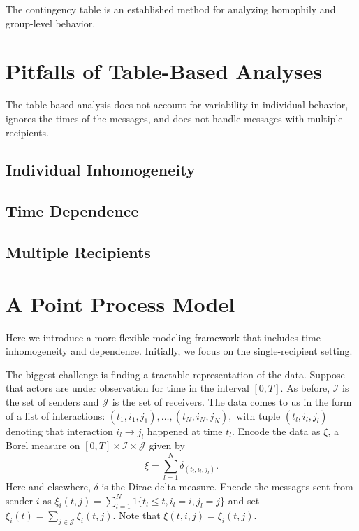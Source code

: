 \documentclass[aoas,preprint]{imsart}
\begin{document}
The contingency table is an established method for analyzing homophily and
group-level behavior.

\section{Pitfalls of Table-Based Analyses}

The table-based analysis does not account for variability in individual
behavior, ignores the times of the messages, and does not handle messages with
multiple recipients.

\subsection{Individual Inhomogeneity}
\subsection{Time Dependence}
\subsection{Multiple Recipients}


\section{A Point Process Model}

Here we introduce a more flexible modeling framework that includes
time-inhomogeneity and dependence.  Initially, we focus on the
single-recipient setting.

The biggest challenge is finding a tractable representation of the data.
Suppose that actors are under observation for time in the interval $[0,T]$. As
before, $\mathcal{I}$ is the set of senders and $\mathcal{J}$ is the set of
receivers. The data comes to us in the form of a list of interactions: $(t_1,
i_1, j_1), \ldots, (t_N, i_N, j_N),$ with tuple $(t_l, i_l, j_l)$ denoting
that interaction $i_l \to j_l$ happened at time $t_l$.  Encode the data as
$\xi$, a Borel measure on $[0,T] \times \mathcal{I} \times \mathcal{J}$ given
by
\[
    \xi = \sum_{l=1}^{N} \delta_{(t_l, i_l, j_l)}.
\]
Here and elsewhere, $\delta$ is the Dirac delta measure.  Encode the messages
sent from sender $i$ as 
$\xi_i(t, j) = \sum_{l=1}^N 1\{t_l \leq t, i_l = i, j_l = j\}$ and set
$\xi_i(t) = \sum_{j \in \mathcal{J}} \xi_i(t,j)$.  Note that
$\xi(t, i, j) = \xi_i(t, j)$.
\end{document}
